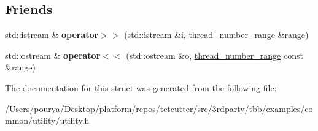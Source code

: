 \subsection*{Friends}
\begin{DoxyCompactItemize}
\item 
\hypertarget{structutility_1_1thread__number__range_a9d207353e68c235b2041a7b1180a7c53}{}std\+::istream \& {\bfseries operator$>$$>$} (std\+::istream \&i, \hyperlink{structutility_1_1thread__number__range}{thread\+\_\+number\+\_\+range} \&range)\label{structutility_1_1thread__number__range_a9d207353e68c235b2041a7b1180a7c53}

\item 
\hypertarget{structutility_1_1thread__number__range_a6b8c84aa65b1154539362accd3ed9b8a}{}std\+::ostream \& {\bfseries operator$<$$<$} (std\+::ostream \&o, \hyperlink{structutility_1_1thread__number__range}{thread\+\_\+number\+\_\+range} const \&range)\label{structutility_1_1thread__number__range_a6b8c84aa65b1154539362accd3ed9b8a}

\end{DoxyCompactItemize}


The documentation for this struct was generated from the following file\+:\begin{DoxyCompactItemize}
\item 
/\+Users/pourya/\+Desktop/platform/repos/tetcutter/src/3rdparty/tbb/examples/common/utility/utility.\+h\end{DoxyCompactItemize}
